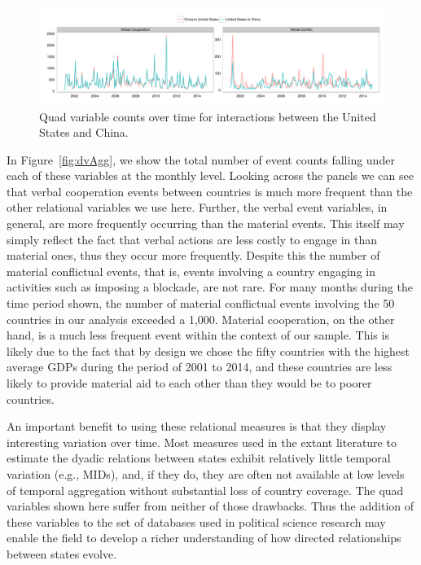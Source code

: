 \documentclass[3p,times,twocolumn,authoryear,12pt]{elsarticle}
\begin{document}
\begin{figure}[ht]
	\centering
	\includegraphics[width=1\textwidth]{US_CHN_Monthly}
	\caption{Quad variable counts over time for interactions between the United States and China.}
	\label{fig:dvParticular}
\end{figure}

In Figure~\ref{fig:dvAgg}, we show the total number of event counts falling under each of these variables at the monthly level. Looking across the panels we can see that verbal cooperation events between countries is much more frequent than the other relational variables we use here. Further, the verbal event variables, in general, are more frequently occurring than the material events. This itself may simply reflect the fact that verbal actions are less costly to engage in than material ones, thus they occur more frequently. Despite this the number of material conflictual events, that is, events involving a country engaging in activities such as imposing a blockade, are not rare. For many months during the time period shown, the number of material conflictual events involving the 50 countries in our analysis exceeded a 1,000. Material cooperation, on the other hand, is a much less frequent event within the context of our sample. This is likely due to the fact that by design we chose the fifty countries with the highest average GDPs during the period of 2001 to 2014, and these countries are less likely to provide material aid to each other than they would be to poorer countries. 

An important benefit to using these relational measures is that they display interesting variation over time. Most measures used in the extant literature to estimate the dyadic relations between states exhibit relatively little temporal variation (e.g., MIDs), and, if they do, they are often not available at low levels of temporal aggregation without substantial loss of country coverage. The quad variables shown here suffer from neither of those drawbacks. Thus the addition of these variables to the set of databases used in political science research may enable the field to develop a richer understanding of how directed relationships between states evolve. 
\end{document}
